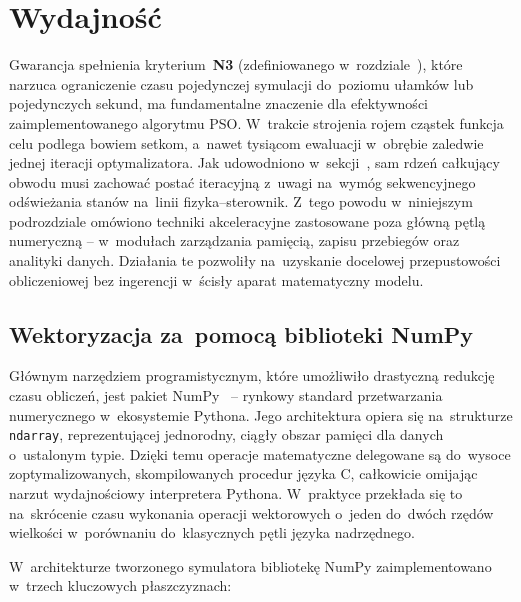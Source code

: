 \section{Wydajność}
\label{sec:wydajnosc}

Gwarancja spełnienia kryterium~\textbf{N3} (zdefiniowanego w~rozdziale~), które narzuca ograniczenie czasu pojedynczej symulacji do~poziomu ułamków lub pojedynczych sekund, ma fundamentalne znaczenie dla efektywności zaimplementowanego algorytmu PSO. W~trakcie strojenia rojem cząstek funkcja celu podlega bowiem setkom, a~nawet tysiącom ewaluacji w~obrębie zaledwie jednej iteracji optymalizatora. Jak udowodniono w~sekcji~, sam rdzeń całkujący obwodu musi zachować postać iteracyjną z~uwagi na~wymóg sekwencyjnego odświeżania stanów na~linii fizyka--sterownik. Z~tego powodu w~niniejszym podrozdziale omówiono techniki akceleracyjne zastosowane poza główną pętlą numeryczną -- w~modułach zarządzania pamięcią, zapisu przebiegów oraz analityki danych. Działania te pozwoliły na~uzyskanie docelowej przepustowości obliczeniowej bez ingerencji w~ścisły aparat matematyczny modelu.

\subsection{Wektoryzacja za~pomocą biblioteki NumPy}
\label{subsec:numpy}

Głównym narzędziem programistycznym, które umożliwiło drastyczną redukcję czasu obliczeń, jest pakiet NumPy~\cite{harris2020numpy} -- rynkowy standard przetwarzania numerycznego w~ekosystemie Pythona. Jego architektura opiera się na~strukturze \texttt{ndarray}, reprezentującej jednorodny, ciągły obszar pamięci dla danych o~ustalonym typie. Dzięki temu operacje matematyczne delegowane są do~wysoce zoptymalizowanych, skompilowanych procedur języka C, całkowicie omijając narzut wydajnościowy interpretera Pythona. W~praktyce przekłada się to na~skrócenie czasu wykonania operacji wektorowych o~jeden do~dwóch rzędów wielkości w~porównaniu do~klasycznych pętli języka nadrzędnego.

W~architekturze tworzonego symulatora bibliotekę NumPy zaimplementowano w~trzech kluczowych płaszczyznach:

